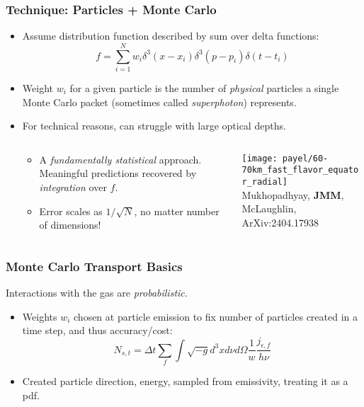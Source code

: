 \documentclass[]{beamer}
\begin{document}
\begin{frame}
  \frametitle{Technique: Particles + Monte Carlo}
  \begin{itemize}
  \item Assume distribution function described by sum over delta functions:
    $$f = \sum_{i=1}^N w_i \delta^3(x - x_i) \delta^3(p - p_i) \delta(t - t_i)$$
  \item Weight $w_i$ for a given particle is the number of
    \textit{physical} particles a single Monte Carlo packet (sometimes
    called \textit{superphoton}) represents.
  \item For technical reasons, can struggle with large optical depths.
    \begin{columns}
      \begin{column}{6.5cm}
        \vspace{-2cm}
        \begin{itemize}
        \item A \textit{fundamentally statistical} approach. Meaningful
          predictions recovered by \textit{integration} over $f$.
        \item Error scales as $1/\sqrt{N}$, no matter number of dimensions!
        \end{itemize}
      \end{column}
      \begin{column}{5.5cm}
        \begin{center}
          \texttt{[image: payel/60-70km\_fast\_flavor\_equator\_radial]}\\
          {\tiny Mukhopadhyay, \textbf{JMM}, McLaughlin, ArXiv:2404.17938}
        \end{center}
      \end{column}
    \end{columns}
\end{itemize}
\end{frame}

\begin{frame}
  \frametitle{Monte Carlo Transport Basics}
  Interactions with the gas are \textit{probabilistic.}
  \begin{itemize}
  \item Weights $w_i$ chosen at particle emission to fix number of particles
    created in a time step, and thus accuracy/cost:
    $$N_{s,t} = \Delta t \sum_f \int \sqrt{-g}d^3 x d\nu d\Omega \frac{1}{w} \frac{j_{\epsilon,f}}{h\nu}$$
  \item Created particle direction, energy, sampled from emissivity, treating it as a pdf.
  \end{itemize}
\end{frame}
\end{document}

